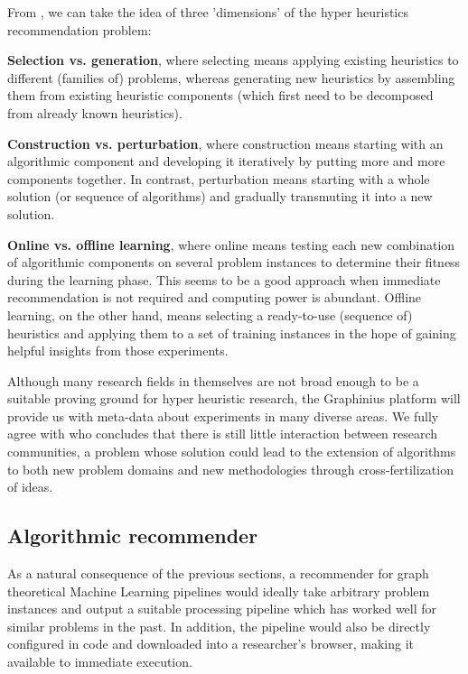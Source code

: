 From \citep{Burke2010}, we can take the idea of three 'dimensions' of the hyper heuristics recommendation problem:

\textbf{Selection vs. generation}, where selecting means applying existing heuristics to different (families of) problems, whereas generating new heuristics by assembling them from existing heuristic components (which first need to be decomposed from already known heuristics).

\textbf{Construction vs. perturbation}, where construction means starting with an algorithmic component and developing it iteratively by putting more and more components together. In contrast, perturbation means starting with a whole solution (or sequence of algorithms) and gradually transmuting it into a new solution.

\textbf{Online vs. offline learning}, where online means testing each new combination of algorithmic components on several problem instances to determine their fitness during the learning phase. This seems to be a good approach when immediate recommendation is not required and computing power is abundant. Offline learning, on the other hand, means selecting a ready-to-use (sequence of) heuristics and applying them to a set of training instances in the hope of gaining helpful insights from those experiments.

Although many research fields in themselves are not broad enough to be a suitable proving ground for hyper heuristic research, the Graphinius platform will provide us with meta-data about experiments in many diverse areas. We fully agree with \cite{Burke2013} who concludes that there is still little interaction between research communities, a problem whose solution could lead to the extension of algorithms to both new problem domains and new methodologies through cross-fertilization of ideas.


\subsection{Algorithmic recommender}
\label{ssect:algo_recommender}

As a natural consequence of the previous sections, a recommender for graph theoretical Machine Learning pipelines would ideally take arbitrary problem instances and output a suitable processing pipeline which has worked well for similar problems in the past. In addition, the pipeline would also be directly configured in code and downloaded into a researcher's browser, making it available to immediate execution.


